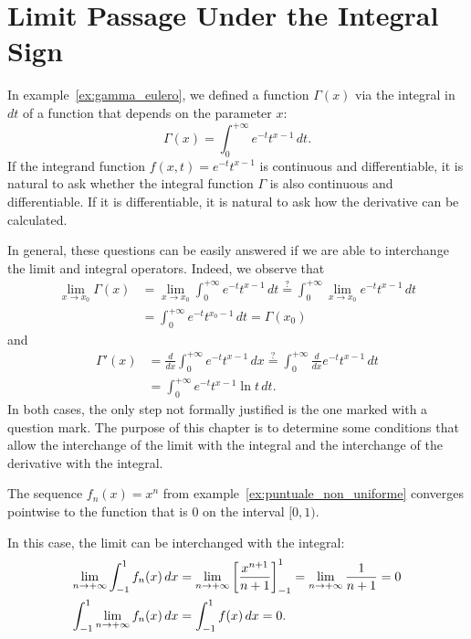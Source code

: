 \section{Limit Passage Under the Integral Sign}
\label{sec:scambio_integrale_limite}%

In example~\ref{ex:gamma_eulero}, we defined a function $\Gamma(x)$ via the
integral in $dt$ of a function that depends on the parameter $x$:
\[
  \Gamma(x) = \int_0^{+\infty} 
  e^{-t}t^{x-1}\, dt.
\] 
If the integrand function $f(x,t)=e^{-t}t^{x-1}$ is continuous and
differentiable, it is natural to ask whether the integral function $\Gamma$ is
also continuous and differentiable. If it is differentiable, it is natural to
ask how the derivative can be calculated.

In general, these questions can be easily answered if we are able to interchange
the limit and integral operators. Indeed, we observe that
\begin{align*}
  \lim_{x\to x_0} \Gamma(x) 
  &= \lim_{x\to x_0} \int_0^{+\infty} e^{-t}t^{x-1} \, dt 
  \stackrel{?}= \int_0^{+\infty} \lim_{x\to x_0} e^{-t}t^{x-1}\, dt\\
  &= \int_0^{+\infty} e^{-t}t^{x_0-1}\, dt
  = \Gamma(x_0)
\end{align*}
and 
\begin{align*}
  \Gamma'(x) 
  &= \frac{d}{dx} \int_0^{+\infty}e^{-t}t^{x-1}\, dx
  \stackrel{?}= \int_0^{+\infty} \frac{d}{dx}e^{-t}t^{x-1}\, dt \\
  &= \int_0^{+\infty} e^{-t}t^{x-1}\ln t\, dt.
\end{align*}
In both cases, the only step not formally justified is the one marked with a
question mark. The purpose of this chapter is to determine some conditions that
allow the interchange of the limit with the integral and the interchange of the
derivative with the integral.

\begin{example}%
The sequence $f_n(x)=x^n$ from example~\ref{ex:puntuale_non_uniforme} converges
pointwise to the function that is $0$ on the interval $[0,1)$.

In this case, the limit can be interchanged with the integral:
\begin{align*}
\lim_{n\to +\infty} \int_{-1}^1 f_n(x)\, dx 
&= \lim_{n\to+\infty} {\left[ \frac{x^{n+1}}{n+1} \right]}_{-1}^1
 = \lim_{n\to+\infty} \frac{1}{n+1} = 0 \\
\int_{-1}^1 \lim_{n\to+\infty} f_n(x)\, dx 
&= \int_{-1}^1 f(x)\, dx = 0.
\end{align*}
\end{example}


